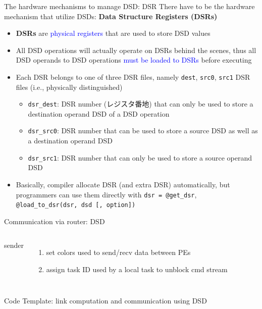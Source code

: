 \documentclass[dvipdfmx, 11pt, aspectratio=169]{beamer}   %
\begin{document}
\begin{frame}{The hardware mechanisms to manage DSD: DSR}
There have to be the hardware mechanism that utilize DSDs: \textbf{Data Structure Registers (DSRs)}
\begin{itemize}
    \item \textbf{DSRs} are \textcolor{blue}{physical registers} that are used to store DSD values
    \item All DSD operations will actually operate on DSRs behind the scenes, thus all DSD operands to DSD operations \textcolor{blue}{must be loaded to DSRs} before executing
    \item Each DSR belongs to one of three DSR files, namely \lstinline|dest|, \lstinline|src0|, \lstinline|src1| DSR files (i.e., physically distinguished)
    \begin{itemize}
        \item \lstinline|dsr_dest|: DSR number (レジスタ番地) that can only be used to store a destination operand DSD of a DSD operation
        \item \lstinline|dsr_src0|: DSR number that can be used to store a source DSD as well as a destination operand DSD
        \item \lstinline|dsr_src1|: DSR number that can only be used to store a source operand DSD
    \end{itemize}
    \item Basically, compiler allocate DSR (and extra DSR) automatically, but programmers can use them directly with \lstinline|dsr = @get_dsr|, \lstinline|@load_to_dsr(dsr, dsd [, option])|
\end{itemize}
\end{frame}
\begin{frame}{Communication via router: DSD}
\begin{columns}
sender
\begin{enumerate}
    \item set colors used to send/recv data between PEs
    \item assign task ID used by a local task to unblock cmd stream
\end{enumerate}
\end{columns}
\end{frame}
\begin{frame}{Code Template: link computation and communication using DSD}

\end{frame}
\end{document}
